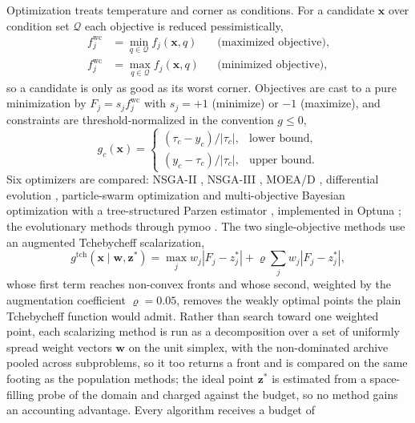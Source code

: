 \documentclass[11pt,a4paper]{article}
\begin{document}
Optimization treats temperature and corner as conditions. For a candidate
$\mathbf{x}$ over condition set $\mathcal{Q}$ each objective is reduced
pessimistically,
\begin{align}
f_j^{\mathrm{wc}} &= \min_{q\in\mathcal{Q}} f_j(\mathbf{x},q)
&& \text{(maximized objective)},
\label{eq:wcmax}\\
f_j^{\mathrm{wc}} &= \max_{q\in\mathcal{Q}} f_j(\mathbf{x},q)
&& \text{(minimized objective)},
\label{eq:wcmin}
\end{align}
so a candidate is only as good as its worst corner. Objectives are cast to a pure
minimization by $F_j = s_j f_j^{\mathrm{wc}}$ with $s_j=+1$ (minimize) or $-1$
(maximize), and constraints are threshold-normalized in the convention $g\le0$,
\begin{equation}
g_c(\mathbf{x}) =
\begin{cases}
(\tau_c - y_c)/|\tau_c|, & \text{lower bound},\\
(y_c - \tau_c)/|\tau_c|, & \text{upper bound}.
\end{cases}
\label{eq:constraint}
\end{equation}
Six optimizers are compared: NSGA-II \cite{deb2002nsga2}, NSGA-III
\cite{deb2014nsga3}, MOEA/D \cite{zhang2007moead}, differential evolution
\cite{storn1997de}, particle-swarm optimization \cite{kennedy1995pso} and
multi-objective Bayesian optimization with a tree-structured Parzen estimator
\cite{bergstra2011tpe}, implemented in Optuna \cite{akiba2019optuna}; the
evolutionary methods through pymoo
\cite{blank2020pymoo}. The two single-objective methods use an augmented
Tchebycheff scalarization,
\begin{equation}
g^{\mathrm{tch}}(\mathbf{x}\mid\mathbf{w},\mathbf{z}^{*}) =
\max_j w_j|F_j-z^{*}_j| + \varrho\sum_j w_j|F_j-z^{*}_j|,
\label{eq:tchebycheff}
\end{equation}
whose first term reaches non-convex fronts and whose second, weighted by the
augmentation coefficient $\varrho=0.05$, removes the weakly optimal points the
plain Tchebycheff function would admit. Rather than search toward one weighted
point, each scalarizing method is run as a decomposition over a set of uniformly
spread weight vectors $\mathbf{w}$ on the unit simplex, with the non-dominated
archive pooled across subproblems, so it too returns a front and is compared on the
same footing as the population methods; the ideal point $\mathbf{z}^{*}$ is
estimated from a space-filling probe of the domain and charged against the budget,
so no method gains an accounting advantage. Every algorithm receives a budget of
\end{document}
